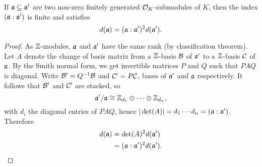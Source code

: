 \begin{prop}
	If $\mathfrak{a}\subseteq\mathfrak{a}'$ are two non-zero finitely generated $\mathcal{O}_K$-submodules of $K$, then the index $(\mathfrak{a}:\mathfrak{a}')$ is finite and satisfies
	\[
		d(\mathfrak{a}) = (\mathfrak{a}:\mathfrak{a}')^2 d(\mathfrak{a}').
	\]
\end{prop}
\begin{proof}
	As $\mathbb{Z}$-modules, $\mathfrak{a}$ and $\mathfrak{a}'$ have the same rank (by classification theorem). Let $A$ denote the change of basis matrix from a $\mathbb{Z}$-basis $\mathcal{B}$ of $\mathfrak{a}'$ to a $\mathbb{Z}$-basis $\mathcal{C}$ of $\mathfrak{a}$. By the Smith normal form, we get invertible matrices $P$ and $Q$ such that $PAQ$ is diagonal. Write $\mathcal{B}'=Q^{-1}\mathcal{B}$ and $\mathcal{C}'=P\mathcal{C}$, bases of $\mathfrak{a}'$ and $\mathfrak{a}$ respectively. It follows that $\mathcal{B}'$ and $\mathcal{C}'$ are stacked, so
	\[
		\mathfrak{a}'/\mathfrak{a} \cong \mathbb{Z}_{d_1} \oplus \cdots \oplus \mathbb{Z}_{d_n},
	\]
	with $d_i$ the diagonal entries of $PAQ$, hence $|\det(A)|=d_1\cdots d_n=(\mathfrak{a}:\mathfrak{a}')$. Therefore
	\begin{align*}
		d(\mathfrak{a}) &= \det(A)^2 d(\mathfrak{a}')\\
			&= (\mathfrak{a}:\mathfrak{a}')^2 d(\mathfrak{a}').
	\end{align*}
\end{proof}
